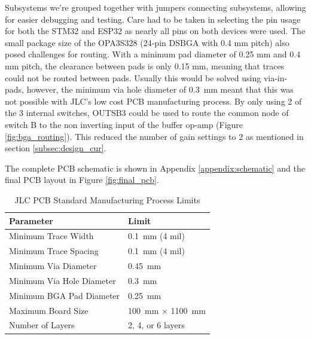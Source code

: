 Subsystems we're grouped together with jumpers connecting subsystems, allowing for easier debugging and testing. Care had to be taken in selecting the pin usage for both the STM32 and ESP32 as nearly all pins on both devices were used. The small package size of the OPA3S328 (24-pin DSBGA with 0.4 mm pitch) also posed challenges for routing. With a minimum pad diameter of 0.25 mm and 0.4 mm pitch, the clearance between pads is only 0.15 mm, meaning that traces could not be routed between pads. Usually this would be solved using via-in-pads, however, the minimum via hole diameter of 0.3 mm meant that this was not possible with JLC's low cost PCB manufacturing process. By only using 2 of the 3 internal switches, OUTSB3 could be used to route the common node of switch B to the non inverting input of the buffer op-amp (Figure \ref{fig:bga_routing}). This reduced the number of gain settings to 2 as mentioned in section \ref{subsec:design_cur}. 

The complete PCB schematic is shown in Appendix \ref{appendix:schematic} and the final PCB layout in Figure \ref{fig:final_pcb}.

\begin{table}[H]
    \centering
    \caption{JLC PCB Standard Manufacturing Process Limits}
    \label{tab:jlc_limits}
    \begin{tabular}{ll}
        \hline
        \textbf{Parameter} & \textbf{Limit} \\
        \hline
        Minimum Trace Width & \SI{0.1}{\milli\meter} (4 mil) \\
        Minimum Trace Spacing & \SI{0.1}{\milli\meter} (4 mil) \\
        Minimum Via Diameter & \SI{0.45}{\milli\meter} \\
        Minimum Via Hole Diameter & \SI{0.3}{\milli\meter} \\
        Minimum BGA Pad Diameter & \SI{0.25}{\milli\meter} \\
        Maximum Board Size & \SI{100}{\milli\meter} × \SI{1100}{\milli\meter} \\
        Number of Layers & 2, 4, or 6 layers \\
        \hline
    \end{tabular}
\end{table}

